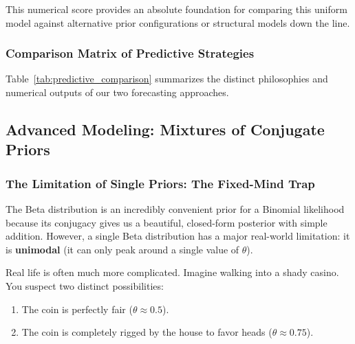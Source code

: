 \documentclass{article}
\begin{document}
This numerical score provides an absolute foundation for comparing this uniform model against alternative prior configurations or structural models down the line.

\subsubsection{Comparison Matrix of Predictive Strategies}
Table~\ref{tab:predictive_comparison} summarizes the distinct philosophies and numerical outputs of our two forecasting approaches.

\begin{table}[htbp]
\centering
\small
\renewcommand{\arraystretch}{1.3}
\caption{Contrasting Point-Based and Distribution-Based Predictions ($M=2$ Future Trials)}
\label{tab:predictive_comparison}
\end{table}

\subsection{Advanced Modeling: Mixtures of Conjugate Priors}

\subsubsection{The Limitation of Single Priors: The Fixed-Mind Trap}
The Beta distribution is an incredibly convenient prior for a Binomial likelihood because its conjugacy gives us a beautiful, closed-form posterior with simple addition. However, a single Beta distribution has a major real-world limitation: it is \textbf{unimodal} (it can only peak around a single value of $\theta$). 

Real life is often much more complicated. Imagine walking into a shady casino. You suspect two distinct possibilities:
\begin{enumerate}
    \item The coin is perfectly fair ($\theta \approx 0.5$).
    \item The coin is completely rigged by the house to favor heads ($\theta \approx 0.75$).
\end{enumerate}
\end{document}
